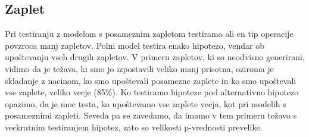 \documentclass[letterpaper,11pt]{article}
\begin{document}

\clearpage
\newpage
\subsection{Zaplet}
Pri testiranju z modelom s posameznim zapletom testiramo ali en tip operacije povzroca manj zapletov. Polni model testira enako hipotezo, vendar ob upoštevanju vseh drugih zapletov. V primeru zapletov, ki so neodvisno generirani, vidimo da je težava, ki smo jo izpostavili veliko manj prisotna, oziroma je skladanje z nacinom, ko smo upoštevali posamezne zaplete in ko smo upoštevali vse zaplete, veliko vecje (85\%). Ko testiramo hipoteze pod alternativno hipotezo opazimo, da je moc testa, ko upoštevamo vse zaplete vecja, kot pri modelih s posameznimi zapleti. Seveda pa se zavedamo, da imamo v tem primeru težavo s veckratnim testiranjem hipotez, zato so velikosti p-vrednosti prevelike.
\end{document}
